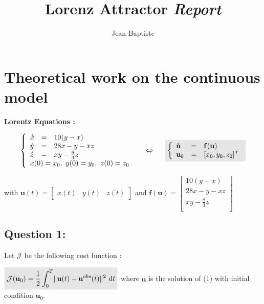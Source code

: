 \documentclass[11pt,a4paper]{article}
\title{
      \bsc{TP Inverse Methods}
      \vskip 1cm
      {\colorb\textbf{Lorenz Attractor}}
      \vskip 1cm
      \colorb\textit{Report}
  }
\author{%
    Jean-Baptiste \bsc{Keck}
    \vskip 0.5cm
    \bsc{M2 Msiam}
}
\makeatletter
\newcommand{\colora}{\color{Blue}}
\def\maketitle{%
    \begin{flushleft}
        \normalfont\LARGE\par
    \end{flushleft}
    \vskip 3cm
    \begin{center}%
        {\colora\specialrule{.2em}{0em}{0em}}
        \vskip 1cm
        {\Huge \@title}%
        \vskip 1cm
        {\colora\specialrule{.2em}{0em}{0em}}
        \vskip 5cm
        {\Huge \@author\par}%
        \vskip 2cm
        {\Huge \@date\par}%
        \vskip 1cm

    \end{center}%
    \clearpage
}
\renewcommand{\norm}[1]{\lVert #1 \rVert}
\renewcommand{\dt}{\ \mathrm{d}t}
\renewcommand{\u} {\mathbf{u}}
\renewcommand{\f} {\mathbf{f}}
\renewcommand{\ud}{\mathring{\mathbf{u}}}
\renewcommand{\uobs}{\mathbf{u}^{obs}}}
\renewcommand{\J}{\mathcal{J}}
\renewcommand{\colbox}[1]{\colorbox{lightgray}{$ #1 $}}
\makeatother
\begin{document}
\pagestyle{fancy}

\maketitle

\clearpage

\section{Theoretical work on the continuous model}

\textbf{Lorentz Equations :}
\vskip 0.2cm

$$
\begin{equation} \label{eq:lorentz}
\left \{
\begin{array}{l c l}
    \mathring{x} & = & 10(y - x)\\
    \mathring{y} & = & 28x - y -xz\\
    \mathring{z} & = & xy - \frac{8}{3}z\\
    \multicolumn{3}{l}{x(0) = x_0,\ y(0) = y_0,\ z(0) = z_0}
\end{array}
\right .
\hskip 0.5cm
\Leftrightarrow 
\hskip 0.5cm
\colbox{
\left \{
\begin{array}{l c l}
\ud&=&\f(\u) \\
\u_0&=&[x_0, y_0, z_0]^T
\end{array}
\right .
}
\end{equation}
$$

with $\u(t) = 
\left [
    \begin{array}{c}
        x(t)&
        y(t)&
        z(t)
    \end{array}
\right ]$
and $\f(\u) =
\left [
    \begin{array}{c}
        10(y - x)\\
        28x - y -xz\\
        xy - \frac{8}{3}z\\
    \end{array}
\right ]
$

\vskip 0.5cm
\subsection{Question 1:} 

\vskip 0.3cm
\noindent Let $\J$ be the following cost function :
\vskip 0.3cm

$\colbox{\J(\u_0) = \dfrac{1}{2}\displaystyle \int_0^T\norm{\u(t)-\uobs(t)}^2 \dt}$ where $\u$ is the solution of (1) with initial condition $\u_0$.
\end{document}
